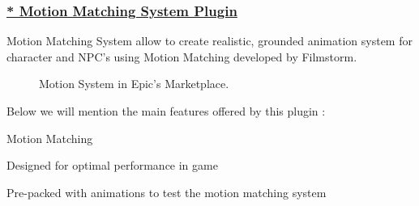 \documentclass[12pt]{book}
\begin{document}
\subsubsection{\underline{* Motion Matching System Plugin}} 
Motion Matching System allow to create realistic, grounded animation system for character and NPC's using Motion Matching developed by Filmstorm.\cite{url-5} 
\begin{figure}[!h]
    \centering
    \caption{Motion System in Epic's Marketplace.}
   \end{figure}

Below we will mention the main features offered by this plugin :

\begin{list}{-}{}
  \item Motion Matching
    \item Designed for optimal performance in game
     \item  Pre-packed with animations to test the motion matching system
\end{list}
\end{document}
